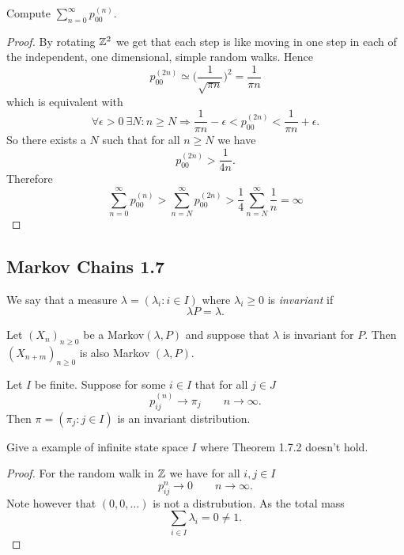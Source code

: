 \begin{thm}
Compute \(\sum _{n=0}^\infty p_{00}^{(n)}.\)
\end{thm}

\begin{proof}
By rotating \(\Bbb{Z}^{2}\) we get that each step is like moving in one step in each of the independent, one dimensional, simple random walks. Hence
\[
p_{00}^{(2n)}\simeq \bigg(\frac{1}{\sqrt {\pi n}}\bigg)^2=\frac{1}{\pi n}
\]
which is equivalent with
\[
\forall \epsilon>0\  \exists N:n\geq N\Longrightarrow \frac{1}{\pi n}-\epsilon<p_{00}^{(2n)}<\frac{1}{\pi n}+\epsilon.
\]
So there exists a \(N\) such that for all \(n\geq N\) we have
\[
p_{00}^{(2n)}>\frac{1}{4n}.
\]
Therefore
\[
\sum _{n=0}^\infty p_{00}^{(n)}>\sum _{n=N}^\infty p_{00}^{(2n)}>\frac{1}{4}\sum _{n=N}^\infty \frac{1}{n}=\infty 
\]

\end{proof}
\subsection{Markov Chains 1.7}
\begin{defn}
We say that a measure \(\lambda =(\lambda _{i}: i\in I)\) where \(\lambda _{i}\geq 0\) is \emph{invariant} if
\[
\lambda P=\lambda .
\]
\end{defn}

\begin{thm}[Theorem 1.7.1]
Let \((X_{n})_{n\geq 0}\) be a Markov\((\lambda ,P)\) and suppose that \(\lambda \) is invariant for \(P\). Then \((X_{n+m})_{n\geq 0}\) is also Markov \((\lambda ,P)\).
\end{thm}

\begin{thm}[Theorem 1.7.2]
Let \(I\) be finite. Suppose for some \(i\in I\) that for all \(j\in J\)
\[
p_{ij}^{(n)}\rightarrow \pi _{j} \qquad n\rightarrow \infty .
\]
Then \(\pi =(\pi _{j}:j\in I)\) is an invariant distribution.
\end{thm}

\begin{prop}
Give a example of infinite state space \(I\) where Theorem 1.7.2 doesn't hold.
\end{prop}

\begin{proof}
For the random walk in \(\Bbb{Z}\) we have for all \(i,j\in I\)
\[
p_{ij}^n\rightarrow 0 \qquad n\rightarrow \infty .
\]
Note however that \((0,0,\ldots )\) is not a distrubution. As the total mass
\[
\sum _{i\in I}\lambda _{i}=0\neq 1.
\]
\end{proof}


